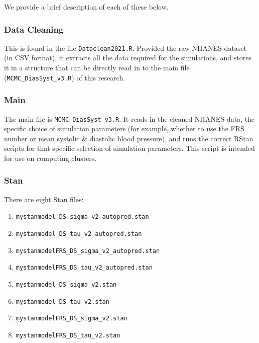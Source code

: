 \documentclass[
]{article}
\providecommand{\tightlist}{%
  \setlength{\itemsep}{0pt}\setlength{\parskip}{0pt}}
\begin{document}
We provide a brief description of each of these below.

\hypertarget{data-cleaning}{%
\subsubsection{Data Cleaning}\label{data-cleaning}}

This is found in the file \texttt{Dataclean2021.R}. Provided the raw
NHANES dataset (in CSV format), it extracts all the data required for
the simulations, and stores it in a structure that can be directly read
in to the main file (\texttt{MCMC\_DiasSyst\_v3.R}) of this research.

\hypertarget{main}{%
\subsubsection{Main}\label{main}}

The main file is \texttt{MCMC\_DiasSyst\_v3.R}. It reads in the cleaned
NHANES data, the specific choice of simulation parameters (for example,
whether to use the FRS number or mean systolic \& diastolic blood
pressure), and runs the correct RStan scripts for that specific
selection of simulation parameters. This script is intended for use on
computing clusters.

\hypertarget{stan}{%
\subsubsection{Stan}\label{stan}}

There are eight Stan files:

\begin{enumerate}
\def\labelenumi{\arabic{enumi}.}
\tightlist
\item
  \texttt{mystanmodel\_DS\_sigma\_v2\_autopred.stan}
\item
  \texttt{mystanmodel\_DS\_tau\_v2\_autopred.stan}
\item
  \texttt{mystanmodelFRS\_DS\_sigma\_v2\_autopred.stan}
\item
  \texttt{mystanmodelFRS\_DS\_tau\_v2\_autopred.stan}
\item
  \texttt{mystanmodel\_DS\_sigma\_v2.stan}
\item
  \texttt{mystanmodel\_DS\_tau\_v2.stan}
\item
  \texttt{mystanmodelFRS\_DS\_sigma\_v2.stan}
\item
  \texttt{mystanmodelFRS\_DS\_tau\_v2.stan}
\end{enumerate}
\end{document}
